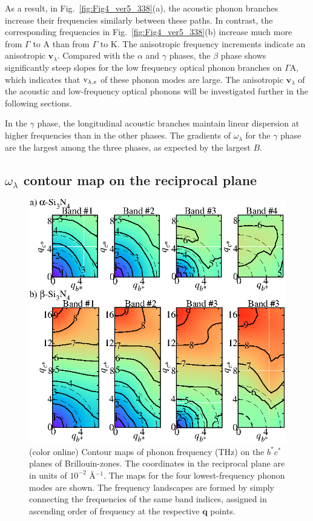 \documentclass[twocolumn,amsmath,amssymb,a4paper,prb,superscriptaddress,floatfix]{revtex4-1}
\begin{document}
As a result, in Fig.~\ref{fig:Fig4_ver5_338}(a), the acoustic phonon branches
increase their frequencies similarly between these paths. In contrast, the
corresponding frequencies in Fig.~\ref{fig:Fig4_ver5_338}(b) increase much more
from $\Gamma$ to A than from $\Gamma$ to K. The anisotropic frequency
increments indicate an anisotropic $\mathbf{v}_\lambda$. Compared with the
$\alpha$ and $\gamma$ phases, the $\beta$ phase shows significantly steep slopes
for the low frequency optical phonon branches on $\Gamma$A, which indicates that
 $\rm{v}_{\lambda,z}$ of these phonon modes are large. The anisotropic
$\mathbf{v}_\lambda$ of the acoustic and low-frequency optical phonons will be
investigated further in the following sections. 

In the $\gamma$ phase, the longitudinal acoustic branches maintain linear
dispersion at higher frequencies than in the other phases. The gradients of
$\omega_\lambda$ for the $\gamma$ phase are the largest among the three phases,
as expected by the largest $B$.

\subsection{$\omega_\lambda$ contour map on the reciprocal plane}

\begin{figure}[ht]
 \centerins
  \includegraphics[width=\linewidth]{Fig2_small.eps} \caption{(color
  online) Contour maps of phonon frequency (THz) on the $b^*c^*$
  planes of Brillouin-zones. The coordinates in the reciprocal plane 
   are in units of $10^{-2}$ \AA$^{-1}$. The maps for the four lowest-frequency
  phonon modes are shown. The frequency landscapes are formed by simply
  connecting the frequencies of the same band indices, assigned in
  ascending order of frequency at the respective $\mathbf {q}$
  points. \label{fig:Fig3_338} }
 \centering
\end{figure}
\end{document}
